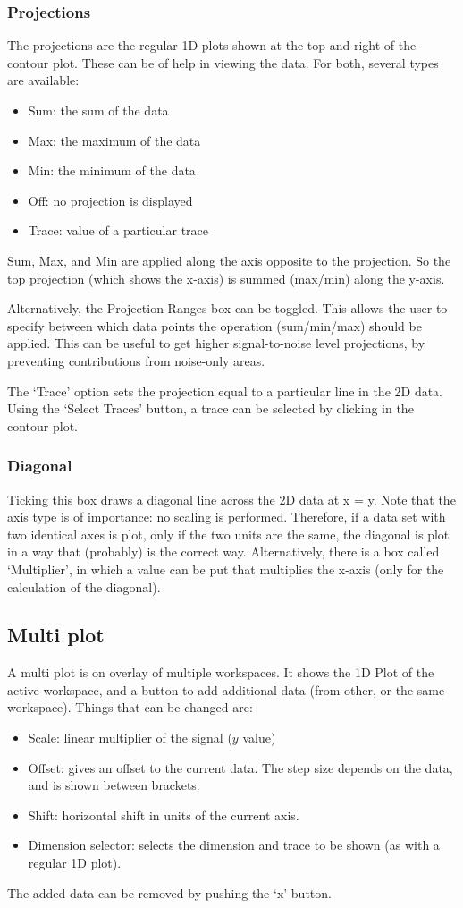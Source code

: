 \documentclass[11pt,a4paper]{article}
\begin{document}
\subsubsection*{Projections}
The projections are the regular 1D plots shown at the top and right of the contour plot. These can be of help in viewing the data.
For both, several types are available:
\begin{itemize}
  \item Sum: the sum of the data
  \item Max: the maximum of the data
  \item Min: the minimum of the data
  \item Off: no projection is displayed
  \item Trace: value of a particular trace
\end{itemize}
Sum, Max, and Min are applied along the axis opposite to the projection. So the top projection
(which shows the x-axis) is summed (max/min) along the y-axis.

Alternatively, the Projection Ranges box can be toggled. This allows the user to specify between
which data points the operation (sum/min/max) should be applied.  This can be useful to get higher
signal-to-noise level projections, by preventing contributions from noise-only areas.

The `Trace' option sets the projection equal to a particular line in the 2D data. Using the `Select
Traces' button, a trace can be selected by clicking in the contour plot.

\subsubsection*{Diagonal}
Ticking this box draws a diagonal line across the 2D data at x = y. Note that the axis type is of importance: no scaling is performed.
Therefore, if a data set with two identical axes is plot, only if the two units are the same, the diagonal is plot in a way that (probably) is the correct way.
Alternatively, there is a box called `Multiplier', in which a value can be put that multiplies the x-axis (only for the calculation of the diagonal).


\subsection{Multi plot}
A multi plot is on overlay of multiple workspaces. It shows the 1D Plot of the active workspace, and a button
to add additional data (from other, or the same workspace). Things that can be changed are:
\begin{itemize}
  \item Scale: linear multiplier of the signal ($y$ value)
  \item Offset: gives an offset to the current data. The step size depends on the data, and is shown between
	 brackets.
  \item Shift: horizontal shift in units of the current axis.
  \item Dimension selector: selects the dimension and trace to be shown (as with a regular 1D plot).
\end{itemize}
The added data can be removed by pushing the `x' button.
\end{document}
